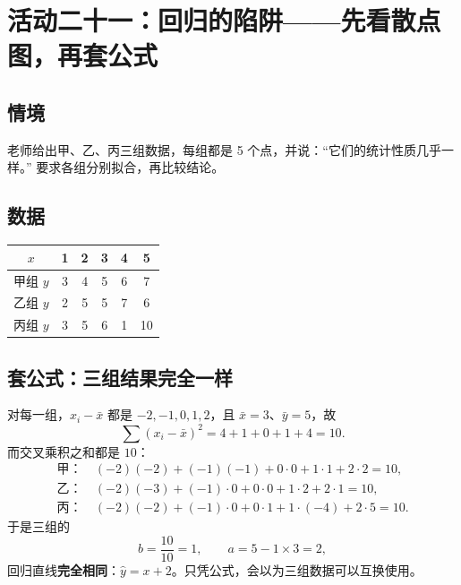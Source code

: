\section{活动二十一：回归的陷阱——先看散点图，再套公式}

\subsection{情境}
老师给出甲、乙、丙三组数据，每组都是 5 个点，并说：“它们的统计性质几乎一样。”
要求各组分别拟合，再比较结论。

\subsection{数据}
\begin{center}
\footnotesize
\setlength{\tabcolsep}{6pt}
\renewcommand{\arraystretch}{1.4}
\begin{tabular}{c|ccccc}
\toprule
$x$ & 1 & 2 & 3 & 4 & 5 \\
\midrule
甲组 $y$ & 3 & 4 & 5 & 6 & 7 \\
乙组 $y$ & 2 & 5 & 5 & 7 & 6 \\
丙组 $y$ & 3 & 5 & 6 & 1 & 10 \\
\bottomrule
\end{tabular}
\end{center}

\subsection{套公式：三组结果完全一样}
对每一组，$x_i-\bar x$ 都是 $-2,-1,0,1,2$，且 $\bar x=3$、$\bar y=5$，故
\[
  \sum(x_i-\bar x)^2=4+1+0+1+4=10.
\]
而交叉乘积之和都是 $10$：
\[
  \begin{aligned}
  \text{甲：}&\ (-2)(-2)+(-1)(-1)+0\cdot0+1\cdot1+2\cdot2=10,\\
  \text{乙：}&\ (-2)(-3)+(-1)\cdot0+0\cdot0+1\cdot2+2\cdot1=10,\\
  \text{丙：}&\ (-2)(-2)+(-1)\cdot0+0\cdot1+1\cdot(-4)+2\cdot5=10.
  \end{aligned}
\]
于是三组的
\[
  b=\frac{10}{10}=1,\qquad a=5-1\times3=2,
\]
回归直线\textbf{完全相同}：$\hat y=x+2$。只凭公式，会以为三组数据可以互换使用。

